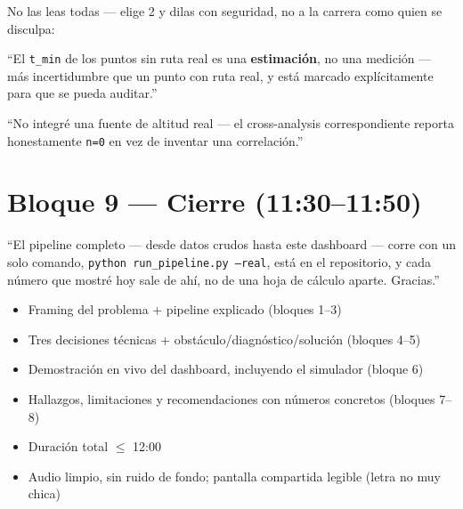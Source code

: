 \documentclass[11pt]{article}
\begin{document}
\begin{decirbox}
No las leas todas --- elige 2 y dilas con seguridad, no a la carrera
como quien se disculpa:

``El \texttt{t\_min} de los puntos sin ruta real es una
\textbf{estimación}, no una medición --- más incertidumbre que un punto
con ruta real, y está marcado explícitamente para que se pueda
auditar.''

``No integré una fuente de altitud real --- el cross-analysis
correspondiente reporta honestamente \texttt{n=0} en vez de inventar
una correlación.''
\end{decirbox}

\section{Bloque 9 --- Cierre (11:30--11:50)}

\begin{decirbox}
``El pipeline completo --- desde datos crudos hasta este dashboard ---
corre con un solo comando, \texttt{python run\_pipeline.py --real}, está
en el repositorio, y cada número que mostré hoy sale de ahí, no de una
hoja de cálculo aparte. Gracias.''
\end{decirbox}

\vspace{0.4cm}
\begin{tcolorbox}[colback=gray!8, colframe=gray!50, arc=2pt, coltitle=black, colbacktitle=gray!25, title=\textbf{Checklist final antes de exportar}]
\begin{itemize}[leftmargin=1.2em, itemsep=2pt]
\item[$\square$] Framing del problema + pipeline explicado (bloques 1--3)
\item[$\square$] Tres decisiones técnicas + obstáculo/diagnóstico/solución (bloques 4--5)
\item[$\square$] Demostración en vivo del dashboard, incluyendo el simulador (bloque 6)
\item[$\square$] Hallazgos, limitaciones y recomendaciones con números concretos (bloques 7--8)
\item[$\square$] Duración total $\le$ 12:00
\item[$\square$] Audio limpio, sin ruido de fondo; pantalla compartida legible (letra no muy chica)
\end{itemize}
\end{tcolorbox}
\end{document}
